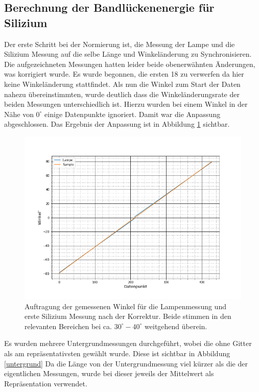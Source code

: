 \subsection{Berechnung der Bandlückenenergie für Silizium}
Der erste Schritt bei der Normierung ist, die Messung der Lampe und die Silizium Messung auf die selbe Länge und Winkeländerung zu Synchronisieren. Die aufgezeichneten Messungen hatten leider beide obenerwähnten Änderungen, was korrigiert wurde. Es wurde begonnen, die ersten 18 zu verwerfen da hier keine Winkeländerung stattfindet. Als nun die Winkel zum Start der Daten nahezu übereinstimmten, wurde deutlich dass die Winkeländerungsrate der beiden Messungen unterschiedlich ist. Hierzu wurden bei einem Winkel in der Nähe von $0^{\circ}$ einige Datenpunkte ignoriert. Damit war die Anpassung abgeschlossen. Das Ergebnis der Anpassung ist in Abbildung \ref{anpassung_si_1} sichtbar. 

\begin{figure}[h]
	\centering

	\includegraphics[scale=0.5]{Bilder/korrektur_channels}
	\caption[Korrigierter Lampendatensatz]{\small Auftragung der gemessenen Winkel für die Lampenmessung und erste Silizium Messung nach der Korrektur. Beide stimmen in den relevanten Bereichen bei ca. $30^{\circ}-40^{\circ}$ weitgehend überein.}	
	\label{anpassung_si_1}
\end{figure}

Es wurden mehrere Untergrundmessungen durchgeführt, wobei die ohne Gitter als am repräsentativsten gewählt wurde. Diese ist sichtbar in Abbildung \ref{untergrund} Da die Länge von der Untergrundmessung viel kürzer als die der eigentlichen Messungen, wurde bei dieser jeweils der Mittelwert als Repräsentation verwendet. 

